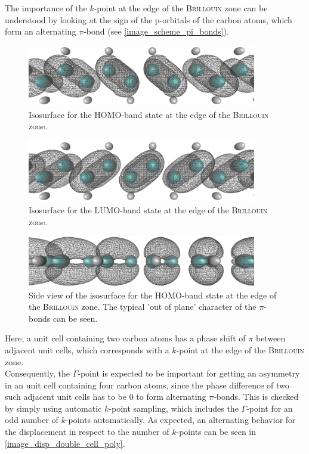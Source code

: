 \newpage The importance of the $k$-point at the edge of the \textsc{Brillouin} zone can be understood by looking at the sign of the p-orbitals of the carbon atoms, which form an alternating $\pi$-bond (see \cref{image_scheme_pi_bonds}). 
\begin{figure}[!b]
	\centering
	\includegraphics[width = 10cm]{Images/polyacetylene/wavefunctions/Homo}
	\caption{Isosurface for the HOMO-band state at the edge of the \textsc{Brillouin} zone.}
	\label{image_homo1}
\end{figure}
\begin{figure}[!b]
	\centering
	\includegraphics[width = 10cm]{Images/polyacetylene/wavefunctions/LUMO}
	\caption{Isosurface for the LUMO-band state at the edge of the \textsc{Brillouin} zone.}
	\label{image_lumo1}
\end{figure}
\begin{figure}[!b]
	\centering
	\includegraphics[width = 10cm]{Images/polyacetylene/wavefunctions/HOMO_Side_View}
	\caption{Side view of the isosurface for the HOMO-band state at the edge of the \textsc{Brillouin} zone. The typical 'out of plane' character of the $\pi$-bonds can be seen.}
	\label{image_homo1_side_view}
\end{figure}
Here, a unit cell containing two carbon atoms has a phase shift of $\pi$ between adjacent unit cells, which corresponds with a $k$-point at the edge of the \textsc{Brillouin} zone.\\
Consequently, the $\Gamma$-point is expected to be important for getting an asymmetry in an unit cell containing four carbon atoms, since the phase difference of two such adjacent unit cells has to be $0$ to form alternating $\pi$-bonds. This is checked by simply using automatic $k$-point sampling, which includes the $\Gamma$-point for an odd number of $k$-points automatically. As expected, an alternating behavior for the displacement in respect to the number of $k$-points can be seen in \cref{image_disp_double_cell_poly}.\\
